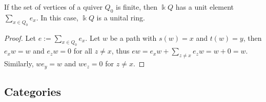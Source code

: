 \begin{lemma}\label{la:unit_in_path_algebra}
If the set of vertices of a quiver $Q_{0}$ is finite, then $\Bbbk Q$ has a unit element $\sum_{x\in Q_{0}} e_{x}$. In this case, $\Bbbk Q$ is a unital ring.
\end{lemma}
\begin{proof}
Let $e := \sum_{x\in Q_{0}} e_{x}$. Let $w$ be a path with $s(w) = x$ and $t(w) = y$, then $e_{x}w = w$ and $e_{z}w = 0$ for all $z \neq x$,
thus $ew = e_{x}w + \sum_{z\neq x} e_{z}w = w + 0 = w$. Similarly, $we_{y} = w$ and $we_{z} = 0$ for $z \neq x$.
\end{proof}

\subsection{Categories}


